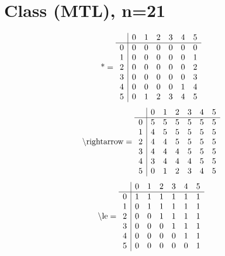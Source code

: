 \documentclass[11pt]{article}
\begin{document}
\section{Class (MTL), n=21}
\[\text{*} = 
\begin{array}{r | r r r r r r}
 & 0 & 1 & 2 & 3 & 4 & 5 \\ \hline
0 & 0 & 0 & 0 & 0 & 0 & 0 \\
1 & 0 & 0 & 0 & 0 & 0 & 1 \\
2 & 0 & 0 & 0 & 0 & 0 & 2 \\
3 & 0 & 0 & 0 & 0 & 0 & 3 \\
4 & 0 & 0 & 0 & 0 & 1 & 4 \\
5 & 0 & 1 & 2 & 3 & 4 & 5 \\
\end{array}
\]
\[\text{\textbackslash rightarrow} = 
\begin{array}{r | r r r r r r}
 & 0 & 1 & 2 & 3 & 4 & 5 \\ \hline
0 & 5 & 5 & 5 & 5 & 5 & 5 \\
1 & 4 & 5 & 5 & 5 & 5 & 5 \\
2 & 4 & 4 & 5 & 5 & 5 & 5 \\
3 & 4 & 4 & 4 & 5 & 5 & 5 \\
4 & 3 & 4 & 4 & 4 & 5 & 5 \\
5 & 0 & 1 & 2 & 3 & 4 & 5 \\
\end{array}
\]
\[\text{\textbackslash le} = 
\begin{array}{r | r r r r r r}
 & 0 & 1 & 2 & 3 & 4 & 5 \\ \hline
0 & 1 & 1 & 1 & 1 & 1 & 1 \\
1 & 0 & 1 & 1 & 1 & 1 & 1 \\
2 & 0 & 0 & 1 & 1 & 1 & 1 \\
3 & 0 & 0 & 0 & 1 & 1 & 1 \\
4 & 0 & 0 & 0 & 0 & 1 & 1 \\
5 & 0 & 0 & 0 & 0 & 0 & 1 \\
\end{array}
\]
\end{document}
